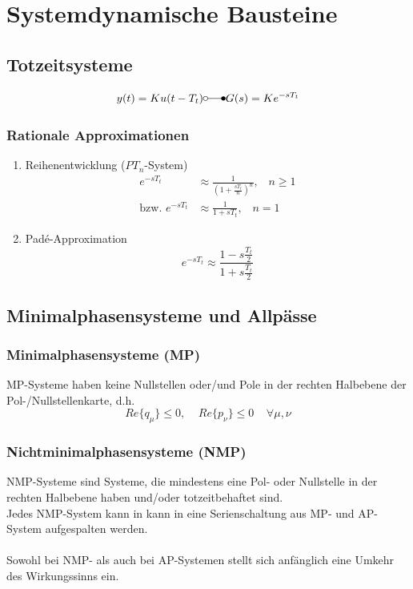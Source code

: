 \documentclass[a4paper,twocolumn,10pt]{article}
\begin{document}
\section{Systemdynamische Bausteine}

\subsection{Totzeitsysteme}
\begin{equation*}
y(t)=Ku(t-T_t)\laplace G(s)=Ke^{-sT_t}
\end{equation*}

\subsubsection{Rationale Approximationen}
\begin{enumerate}[label=$\bullet$]
\item Reihenentwicklung ($PT_n$-System)
\begin{equation*}
\begin{split}
e^{-sT_t}&\approx\frac{1}{\left(1+\frac{sT_t}{n}\right)^n},\;\;\;n\geq 1\\
\text{bzw. }e^{-sT_t}&\approx\frac{1}{1+sT_t},\;\;\;n=1
\end{split}
\end{equation*}
\item Padé-Approximation
\begin{equation*}
e^{-sT_t}\approx\frac{1-s\frac{T_t}{2}}{1+s\frac{T_t}{2}}
\end{equation*}
\end{enumerate}

\subsection{Minimalphasensysteme und Allpässe}

\subsubsection{Minimalphasensysteme (MP)}
MP-Systeme haben keine Nullstellen oder/und Pole in der rechten Halbebene der Pol-/Nullstellenkarte, d.h.
\begin{equation*}
Re\{q_{\mu}\}\leq 0,\;\;\;\;Re\{p_{\nu}\}\leq 0\;\;\;\;\forall\mu,\nu
\end{equation*}

\subsubsection{Nichtminimalphasensysteme (NMP)}
NMP-Systeme sind Systeme, die mindestens eine Pol- oder Nullstelle in der rechten Halbebene haben und/oder totzeitbehaftet sind.\\
Jedes NMP-System kann in kann in eine Serienschaltung aus MP- und AP-System aufgespalten werden.\\\\
Sowohl bei NMP- als auch bei AP-Systemen stellt sich anfänglich eine Umkehr des Wirkungssinns ein.
\end{document}
